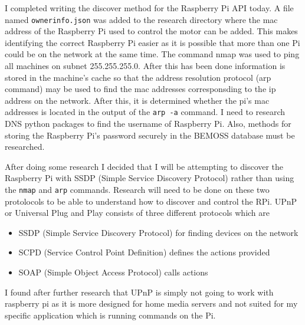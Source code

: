 \documentclass[fontsize=11pt, %
                             paper=letter, %
                             twoside, %
                             captions=tableheading,
                             index=totoc,
                             hyperref]{labbook}
\begin{document}
\begin{addmargin}[0cm]{0cm}
I completed writing the discover method for the Raspberry Pi API today. A file named \texttt{ownerinfo.json} was added to the research directory where the mac address of the Raspberry Pi used to control the motor can be added. This makes identifying the correct Raspberry Pi easier as it is possible that more than one Pi could be on the network at the same time. The command nmap was used to ping all machines on subnet 255.255.255.0. After this has been done information is stored in the machine's cache so that the address resolution protocol (arp command) may be used to find the mac addresses corresponsding to the ip address on the network. After this, it is determined whether the pi's mac addresses is located in the output of the \texttt{arp -a} command.
\bigbreak\noindent
I need to research DNS python packages to find the username of Raspberry Pi. Also, methods for storing the Raspberry Pi's password securely in the BEMOSS database must be researched.

After doing some research I decided that I will be attempting to discover the Raspberry Pi with SSDP (Simple Service Discovery Protocol) rather than using the \texttt{nmap} and \texttt{arp} commands. Research will need to be done on these two protolocols to be able to understand how to discover and control the RPi.
\bigbreak\noindent
UPnP or Universal Plug and Play consists of three different protocols which are 
\begin{itemize}
\item SSDP (Simple Service Discovery Protocol) for finding devices on the network
\item SCPD (Service Control Point Definition) defines the actions provided 	
\item SOAP (Simple Object Access Protocol) calls actions
\end{itemize}
I found after further research that UPnP is simply not going to work with raspberry pi as it is more designed for home media servers and not suited for my specific application which is running commands on the Pi.


\end{addmargin}
\end{document}
